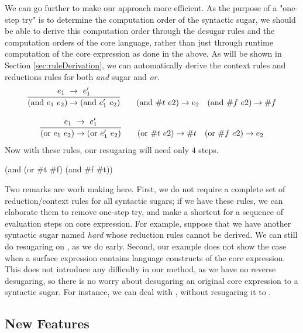 We can go further to make our approach more efficient. As the purpose of a "one-step try" is to determine the computation order of the syntactic sugar, we should be able to derive this computation order through the desugar rules and the computation orders of the core language, rather than just through runtime computation of the core expression as done in the above. As will be shown in Section \ref{sec:ruleDerivation}, we can automatically derive the context rules and reductions rules for both \emph{and} sugar and \emph{or}.
\[
\begin{array}{c}
\infer {(\mbox{and}~e_1~e_2) \rightarrow (\mbox{and}~e_1'~e_2)} {e_1~ \rightarrow~e_1'}
\qquad
(\mbox{and}~\#t~e2) \rightarrow e_2
\quad
(\mbox{and}~\#f~e2) \rightarrow \#f \\
\\
\infer {(\mbox{or}~e_1~e_2) \rightarrow (\mbox{or}~e_1'~e_2)} {e_1~ \rightarrow~e_1'}
\qquad
(\mbox{or}~\#t~e2) \rightarrow \#t
\quad
(\mbox{or}~\#f~e2) \rightarrow e_2 \\
\end{array}
\]
Now with these rules, our resugaring will need only $4$ steps.
\begin{Codes}
    (and (or \#t \#f) (and \#f \#t))
\end{Codes}

Two remarks are worh making here. First, we do not require a complete set of reduction/context rules for all syntactic sugars; if we have these rules, we can elaborate them to remove one-step try, and make a shortcut for a sequence of evaluation steps on core expression.
For example, suppose that we have another syntactic sugar named \emph{hard} whose reduction rules cannot be derived.
We can still do resugaring on , as we do early.
Second, our example does not show the case when a surface expression contains language constructs of the core expression. This does not introduce any difficulty in our method, as we have no reverse desugaring, so there is no worry about desugaring an original core expression to a syntactic sugar. For instance, we can deal with , without resugaring it to .


\subsection{New Features}

